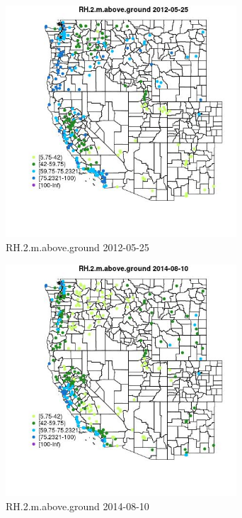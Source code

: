 \begin{figure} 
\centering  
\includegraphics[width=0.77\textwidth]{Code_Outputs/Report_ML_input_PM25_Step4_part_e_de_duplicated_aves_compiled_2019-05-18wNAs_MapObsRH2maboveground2012-05-25.jpg} 
\caption{\label{fig:Report_ML_input_PM25_Step4_part_e_de_duplicated_aves_compiled_2019-05-18wNAsMapObsRH2maboveground2012-05-25}RH.2.m.above.ground 2012-05-25} 
\end{figure} 
 

\begin{figure} 
\centering  
\includegraphics[width=0.77\textwidth]{Code_Outputs/Report_ML_input_PM25_Step4_part_e_de_duplicated_aves_compiled_2019-05-18wNAs_MapObsRH2maboveground2014-08-10.jpg} 
\caption{\label{fig:Report_ML_input_PM25_Step4_part_e_de_duplicated_aves_compiled_2019-05-18wNAsMapObsRH2maboveground2014-08-10}RH.2.m.above.ground 2014-08-10} 
\end{figure} 
 


